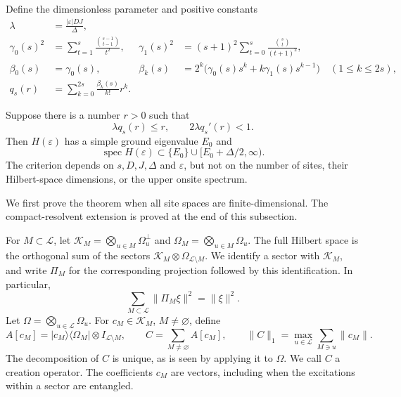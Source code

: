 Define the dimensionless parameter and positive constants
\begin{align}
 \lambda&=\frac{|\varepsilon|DJ}{\Delta},
 \label{sc:lambda}\\
 \gamma_0(s)^2&=\sum_{t=1}^{s}\frac{\binom{s-1}{t-1}}{t^2},
 &\gamma_1(s)^2&=(s+1)^2\sum_{t=0}^{s}
                        \frac{\binom{s}{t}}{(t+1)^2},
 \label{sc:gammas}\\
 \beta_0(s)&=\gamma_0(s),
 &\beta_k(s)&=2^k\bigl(\gamma_0(s)s^k+
                         k\gamma_1(s)s^{k-1}\bigr)
                         \quad(1\le k\le2s),
 \label{sc:betas}\\
 q_s(r)&=\sum_{k=0}^{2s}\frac{\beta_k(s)}{k!}r^k.
 \label{sc:majorant}
\end{align}

\begin{theorem}
\label{sc:stability}
Suppose there is a number $r>0$ such that
\begin{equation}
 \lambda q_s(r)\le r,
 \qquad 2\lambda q_s'(r)<1.
 \label{sc:criterion}
\end{equation}
Then $H(\varepsilon)$ has a simple ground eigenvalue $E_0$ and
\begin{equation}
 \operatorname{spec}H(\varepsilon)
 \subset\{E_0\}\cup[E_0+\Delta/2,\infty).
 \label{sc:gap}
\end{equation}
The criterion depends on $s,D,J,\Delta$ and $\varepsilon$, but not on
the number of sites, their Hilbert-space dimensions, or the upper
onsite spectrum.
\end{theorem}

We first prove the theorem when all site spaces are finite-dimensional.
The compact-resolvent extension is proved at the end of this subsection.

For $M\subset\mathcal L$, let
$\mathcal K_M=\bigotimes_{u\in M}\Omega_u^\perp$ and
$\Omega_M=\bigotimes_{u\in M}\Omega_u$. The full Hilbert space is the
orthogonal sum of the sectors
$\mathcal K_M\otimes\Omega_{\mathcal L\setminus M}$.
We identify a sector with $\mathcal K_M$, and write $\Pi_M$ for the
corresponding projection followed by this identification. In particular,
\begin{equation}
 \sum_{M\subset\mathcal L}\|\Pi_M\xi\|^2=\|\xi\|^2.
 \label{sc:orthogonal-sectors}
\end{equation}
Let $\Omega=\bigotimes_{u\in\mathcal L}\Omega_u$.
For $c_M\in\mathcal K_M$, $M\ne\varnothing$, define
\begin{equation}
 A[c_M]=|c_M\rangle\langle\Omega_M|\otimes
                  I_{\mathcal L\setminus M},
 \qquad
 C=\sum_{M\ne\varnothing}A[c_M],
 \qquad
 \|C\|_1=\max_{u\in\mathcal L}
                 \sum_{M\ni u}\|c_M\|.
 \label{sc:creation-norm}
\end{equation}
The decomposition of $C$ is unique, as is seen by applying it to $\Omega$.
We call $C$ a creation operator. The coefficients $c_M$ are vectors,
including when the excitations within a sector are entangled.

